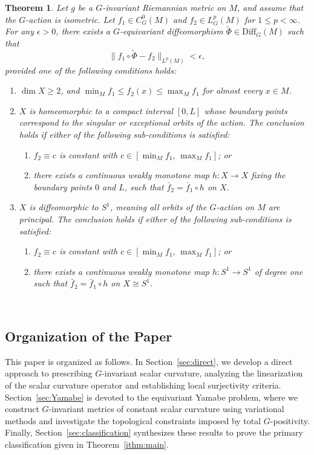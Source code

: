 \documentclass[12pt,a4paper]{amsart}
\theoremstyle{plain}
\newtheorem{theorem}{Theorem}[section]
\theoremstyle{definition}
\theoremstyle{remark}
\newcommand{\ga}{\mathit{g}} %
\begin{document}
\begin{theorem}\label{lem:approximationintro}
Let $\ga$ be a $G$-invariant Riemannian metric on $M$, and assume that the $G$-action is isometric. Let $f_1 \in C^0_G(M)$ and $f_2 \in L^p_G(M)$ for $1 \le p < \infty$. For any $\epsilon > 0$, there exists a $G$-equivariant diffeomorphism $\widetilde{\Phi} \in \mathrm{Diff}_G(M)$ such that
$$\| f_1 \circ \widetilde{\Phi} - f_2 \|_{L^p(M)} < \epsilon,$$
provided one of the following conditions holds:
\begin{enumerate}[label=\textup{(\alph*)}, font=\upshape]
  \item $\dim X \ge 2$, and $\min_M f_1 \le f_2(x) \le \max_M f_1$ for almost every $x \in M$.
  \item $X$ is homeomorphic to a compact interval $[0, L]$ whose boundary points correspond to the singular or exceptional orbits of the action. The conclusion holds if either of the following sub-conditions is satisfied:
  \begin{enumerate}[label=\textup{(b.\arabic*)}, font=\upshape]
    \item $f_2 \equiv c$ is constant with $c \in [\min_M f_1,\, \max_M f_1]$; or
    \item there exists a continuous weakly monotone map $h \colon X \to X$ fixing the boundary points $0$ and $L$, such that $\bar{f}_2 = \bar{f}_1 \circ h$ on $X$.
  \end{enumerate}
  \item $X$ is diffeomorphic to $S^1$, meaning all orbits of the $G$-action on $M$ are principal. The conclusion holds if either of the following sub-conditions is satisfied:
  \begin{enumerate}[label=\textup{(c.\arabic*)}, font=\upshape]
    \item $f_2 \equiv c$ is constant with $c \in [\min_M f_1,\, \max_M f_1]$; or
    \item there exists a continuous weakly monotone map $h \colon S^1 \to S^1$ of degree one such that $\bar{f}_2 = \bar{f}_1 \circ h$ on $X \cong S^1$.
  \end{enumerate}
\end{enumerate}
\end{theorem}

\ 

\subsection*{Organization of the Paper}
This paper is organized as follows. In Section~\ref{sec:direct}, we develop a direct approach to prescribing $G$-invariant scalar curvature, analyzing the linearization of the scalar curvature operator and establishing local surjectivity criteria. Section~\ref{sec:Yamabe} is devoted to the equivariant Yamabe problem, where we construct $G$-invariant metrics of constant scalar curvature using variational methods and investigate the topological constraints imposed by total $G$-positivity. Finally, Section~\ref{sec:classification} synthesizes these results to prove the primary classification given in Theorem~\ref{ithm:main}.
\end{document}
